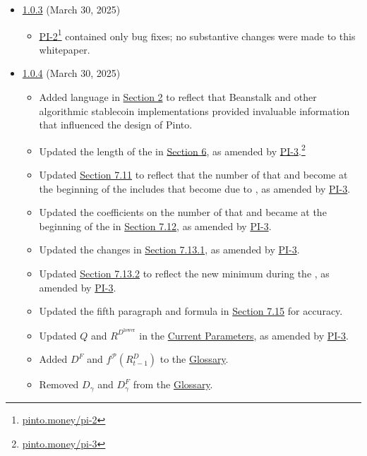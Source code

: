 \documentclass[class=article, crop=false]{standalone}
\begin{document}
\begin{itemize}[topsep=0pt, itemsep=3pt,leftmargin=16pt]
    \item \href{https://github.com/pinto-org/whitepaper/blob/master/version-history/pinto1_0_3.pdf}{1.0.3} (March 30, 2025)
    
    \begin{itemize}
        \item \href{https://pinto.money/pi-2}{PI-2}\footnote{\href{https://pinto.money/pi-2}{pinto.money/pi-2}} contained only bug fixes; no substantive changes were made to this whitepaper.
    \end{itemize}

    \item \href{https://github.com/pinto-org/whitepaper/blob/master/version-history/pinto1_0_4.pdf}{1.0.4} (March 30, 2025)
    
    \begin{itemize}
        \item Added language in \hyperlink{section.2}{Section 2} to reflect that Beanstalk and other algorithmic stablecoin implementations provided invaluable information that influenced the design of Pinto.
        \item Updated the length of the  in \hyperlink{section.6}{Section 6}, as amended by \href{https://pinto.money/pi-3}{PI-3}.\footnote{\href{https://pinto.money/pi-3}{pinto.money/pi-3}}
        \item Updated \hyperlink{subsection.7.11}{Section 7.11} to reflect that the number of  that  and become  at the beginning of the  includes  that become  due to , as amended by \href{https://pinto.money/pi-3}{PI-3}.
        \item Updated the coefficients on the number of  that  and became  at the beginning of the  in \hyperlink{subsection.7.12}{Section 7.12}, as amended by \href{https://pinto.money/pi-3}{PI-3}.
        \item Updated the  changes in \hyperlink{subsubsection.7.13.1}{Section 7.13.1}, as amended by \href{https://pinto.money/pi-3}{PI-3}.
        \item Updated \hyperlink{subsubsection.7.13.2}{Section 7.13.2} to reflect the new minimum  during the , as amended by \href{https://pinto.money/pi-3}{PI-3}.
        \item Updated the fifth paragraph and formula in \hyperlink{subsection.7.15}{Section 7.15} for accuracy.
        \item Updated $Q$ and $R^{D^{\text{lower}}}$ in the \hyperlink{subsection.12.1}{Current Parameters}, as amended by \href{https://pinto.money/pi-3}{PI-3}.
        \item Added $D^{F}$ and $f^{\mathscr{P}}(R_{t-1}^{D})$ to the \hyperlink{subsection.12.14}{Glossary}.
        \item Removed $D_{\gamma}$ and $D_{\gamma}^{F}$ from the \hyperlink{subsection.12.14}{Glossary}.
    \end{itemize}


\end{itemize}
\end{document}

